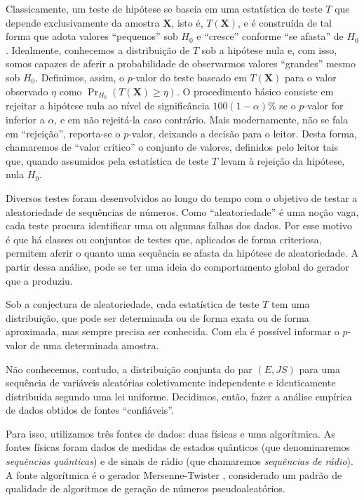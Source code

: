 Classicamente, um teste de hipótese se baseia em uma estatística de teste $T$ que depende exclusivamente da amostra $\bm X$, isto é, $T(\bm X)$, e é construída de tal forma que adota valores ``pequenos'' sob $H_0$ e ``cresce'' conforme ``se afasta'' de $H_0$.
Idealmente, conhecemos a distribuição de $T$ sob a hipótese nula e, com isso, somos capazes de aferir a probabilidade de observarmos valores ``grandes'' mesmo sob $H_0$.
Definimos, assim, o $p$-valor do teste baseado em $T(\bm X)$ para o valor observado $\eta$ como $\Pr_{H_0}(T(\bm X) \geq \eta)$.
O procedimento básico consiste em rejeitar a hipótese nula ao nível de significância $100(1-\alpha)\%$ se o $p$-valor for inferior a $\alpha$, e em não rejeitá-la caso contrário.
Mais modernamente, não se fala em ``rejeição'', reporta-se o $p$-valor, deixando a decisão para o leitor. Desta forma, chamaremos de ``valor crítico'' o conjunto de valores, definidos pelo leitor tais que, quando assumidos pela estatística de teste $T$ levam à rejeição da hipótese, nula $H_0$. 

Diversos testes foram desenvolvidos ao longo do tempo com o objetivo de testar a aleatoriedade de sequências de números.
Como ``aleatoriedade'' é uma noção vaga, cada teste procura identificar uma ou algumas falhas dos dados.
Por esse motivo é que há classes ou conjuntos de testes que, aplicados de forma criteriosa, permitem aferir o quanto uma sequência se afasta da hipótese de aleatoriedade.
A partir dessa análise, pode se ter uma ideia do comportamento global do gerador que a produziu.

Sob a conjectura de aleatoriedade, cada estatística de teste $T$ tem uma distribuição, que pode ser determinada ou de forma exata ou de forma aproximada, mas sempre precisa ser conhecida.
Com ela é possível informar o $p$-valor de uma determinada amostra.

Não conhecemos, contudo, a distribuição conjunta do par $(E,JS)$ para uma sequência de variáveis aleatórias coletivamente independente e identicamente distribuída segundo uma lei uniforme.
Decidimos, então, fazer a análise empírica de dados obtidos de fontes ``confiáveis''.

Para isso, utilizamos três fontes de dados: duas físicas e uma algorítmica.
As fontes físicas foram dados de medidas de estados quânticos \citep{RNGVacuumStates} (que denominaremos \textit{sequências quânticas}) e de sinais de rádio \citep{RandomHostingAdvice} (que chamaremos \textit{sequências de rádio}).
A fonte algorítmica é o gerador Mersenne-Twister \citep{Matsumoto98}, considerado um padrão de qualidade de algoritmos de geração de números pseudoaleatórios.

